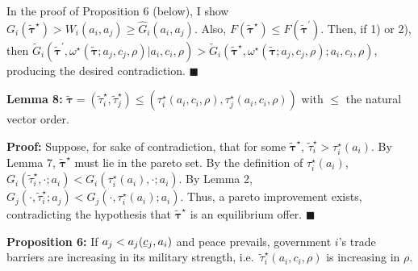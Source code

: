 \documentclass{puthesis}
\DeclareRobustCommand{\ubar}[1]{\underaccent{\bar}{#1}}
\begin{document}
In the proof of Proposition 6 (below), I show
\(G_i(\tilde{\bm{\tau}}^\star) > W_i(a_i, a_j) \geq \hat{G}_i(a_i, a_j)\).
Also, \(F(\tilde{\bm{\tau}}^\star) \leq F(\tilde{\bm{\tau}}^\prime)\).
Then, if 1) or 2), then
\(\tilde{G}_i \left( \tilde{\bm{\tau}}^\prime, \omega^\star(\tilde{\bm{\tau}}; a_j, c_j, \rho) | a_i, c_i, \rho \right) > \tilde{G}_i \left( \tilde{\bm{\tau}}^\star, \omega^\star(\tilde{\bm{\tau}}; a_j, c_j, \rho); a_i, c_i, \rho \right)\),
producing the desired contradiction. \(\blacksquare\)

\textbf{Lemma 8:}
\(\tilde{\bm{\tau}} = \left( \tilde{\tau}_i^\star, \tilde{\tau}_j^\star \right) \leq \left( \tau_i^\star(a_i, c_i, \rho), \tau_j^\star(a_i, c_i, \rho) \right)\)
with \(\leq\) the natural vector order.

\textbf{Proof:} Suppose, for sake of contradiction, that for some
\(\tilde{\bm{\tau}}^\star\),
\(\tilde{\tau}_i^\star > \tau_i^\star(a_i)\). By Lemma 7,
\(\tilde{\bm{\tau}}^\star\) must lie in the pareto set. By the
definition of \(\tau_i^\star(a_i)\),
\(G_i(\tilde{\tau}_i^\star, \cdot; a_i) < G_i(\tau_i^\star(a_i), \cdot; a_i)\).
By Lemma 2,
\(G_j(\cdot, \tilde{\tau}_i^\star; a_j) < G_j(\cdot, \tau_i^\star(a_i); a_i)\).
Thus, a pareto improvement exists, contradicting the hypothesis that
\(\tilde{\bm{\tau}}^\star\) is an equilibrium offer. \(\blacksquare\)

\textbf{Proposition 6:} If \(a_j < a_j(\ubar{c}_j, a_i)\) and peace
prevails, government \(i\)'s trade barriers are increasing in its
military strength, i.e.~\(\tilde{\tau}_i^\star(a_i, c_i, \rho)\) is
increasing in \(\rho\).
\end{document}
